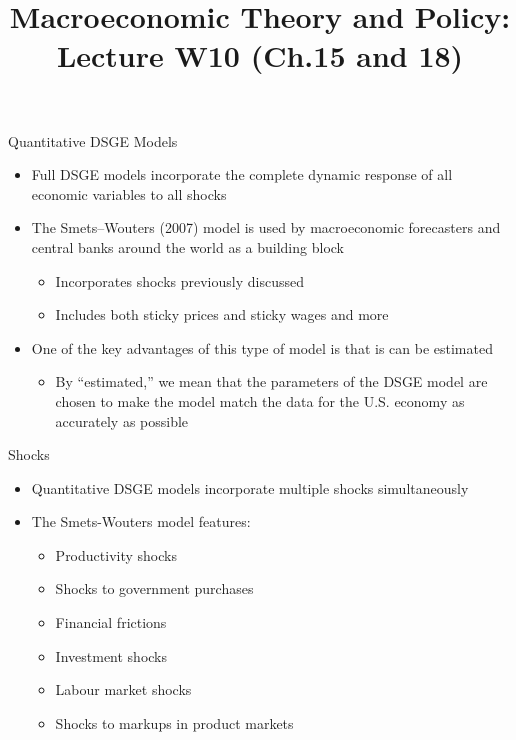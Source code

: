 \documentclass[aspectratio=1610]{beamer}
\title[Winter - Lecture 10] %
{Macroeconomic Theory and Policy: Lecture  W10 (Ch.15 and 18)}
\author[University of Toronto] %
{}
\date[] %
\begin{document}
\begin{frame}
  \titlepage
\end{frame}

\begin{frame}[wide]{Quantitative DSGE Models}
	\begin{itemize}
		\item Full DSGE models incorporate the complete dynamic response of all economic variables to all shocks
		\item The Smets–Wouters (2007) model is used by macroeconomic forecasters and central banks around the world as a building block 
		\begin{itemize}
			\item Incorporates shocks previously discussed 
			\item Includes both sticky prices and sticky wages and more
		\end{itemize}
		
		\item One of the key advantages of this type of model is that is can be estimated
		\begin{itemize}
			\item By “estimated,” we mean that the parameters of the DSGE model are chosen to make the model match the data for the U.S. economy as accurately as possible
		\end{itemize}
	\end{itemize}
\end{frame}

\begin{frame}[wide]{Shocks}
	\begin{itemize}
		\item Quantitative DSGE models incorporate multiple shocks simultaneously
		\item The Smets-Wouters model features:
		\begin{itemize}
			\item Productivity shocks
			\item Shocks to government purchases
			\item Financial frictions
			\item Investment shocks
			\item Labour market shocks
			\item Shocks to markups in product markets
		\end{itemize}
		
	\end{itemize}
\end{frame}
\end{document}
